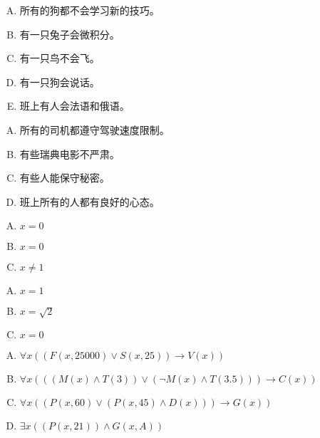 {{        %
        \begin{practices}
            \begin{enumerate}[A.]
                \item 所有的狗都不会学习新的技巧。
                \item 有一只兔子会微积分。
                \item 有一只鸟不会飞。
                \item 有一只狗会说话。
                \item 班上有人会法语和俄语。
            \end{enumerate}
        \end{practices}

        \begin{practices}
            \begin{enumerate}[A.]
                \item 所有的司机都遵守驾驶速度限制。
                \item 有些瑞典电影不严肃。
                \item 有些人能保守秘密。
                \item 班上所有的人都有良好的心态。
            \end{enumerate}
        \end{practices}

        \begin{practices}
            \begin{enumerate}[A.]
                \item $x = 0$
                \item $x = 0$
                \item $x \neq 1$
            \end{enumerate}
        \end{practices}

        \begin{practices}
            \begin{enumerate}[A.]
                \item $x = 1$
                \item $x = \sqrt{2}$
                \item $x = 0$
            \end{enumerate}
        \end{practices}

        \begin{practices}
            \begin{enumerate}[A.]
                \item $\forall x ((F(x, 25000) \vee S(x, 25)) \rightarrow V(x))$
                \item $\forall x (((M(x) \wedge T(3)) \vee (\neg M(x) \wedge T(3.5))) \rightarrow C(x))$
                \item $\forall x ((P(x, 60) \vee (P(x, 45) \wedge D(x))) \rightarrow G(x))$
                \item $\exists x ((P(x, 21)) \wedge G(x, A))$
            \end{enumerate}
        \end{practices}

}}
